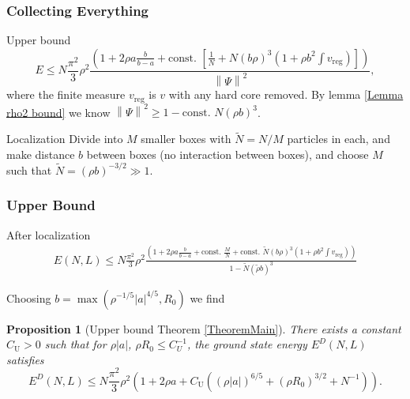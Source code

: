 \documentclass{beamer}[10]
\newcommand{\norm}[1]{\left\lVert #1 \right\rVert}
\newcommand{\abs}[1]{\left\lvert #1 \right\rvert}
\newtheorem{mproposition}{Proposition}
\begin{document}
\begin{frame}
	\frametitle{Collecting Everything}
	\begin{block}{Upper bound}
	\small\begin{equation}
	E\leq N\frac{\pi^2}{3}\rho^2\frac{\left(1+2\rho a\frac{b}{b-a} +\text{const. } \left[\frac{1}{N}+ N (b\rho)^3\left(1+\rho b^2\int v_{\text{reg}}\right)\right]\right)}{\norm{\Psi}^2},
	\end{equation}	
	where  the finite measure $ v_{\text{reg}} $ is $v$ with any hard core removed.
		By lemma \ref{Lemma rho2 bound} we know $ \norm{\Psi}^2\geq 1-\text{const. }N(\rho b)^3 $.
	\end{block}	
	\begin{block}{Localization}
		Divide into $ M $ smaller boxes with $ \tilde{N}=N/M $ particles in each, and make distance $ b $ between boxes (no interaction between boxes), and choose $ M $ such that $ \tilde{N}=(\rho b)^{-3/2}\gg 1 $.
	\end{block}

\end{frame}

\begin{frame}
	\frametitle{Upper Bound}
	\begin{block}{After localization}
\footnotesize\begin{equation}
\begin{aligned}
E(N,L)\leq N\frac{\pi^2}{3}\rho^2\frac{\left(1+2\rho a\frac{b}{b-a}+\text{const. }\frac{M}{N}+\text{const. }\tilde{N}(b\rho)^3\left(1+\rho b^2\int v_{\text{reg}}\right)\right)}{1-\tilde{N}(\tilde{\rho} b)^3}
\end{aligned}
\end{equation}

Choosing $ b=\max(\rho^{-1/5}\abs{a}^{4/5}, R_0) $ we find

\begin{mproposition}[Upper bound Theorem \ref{TheoremMain}]
	\label{PropositionUpperBound}
 There exists a constant $C_\text{U}>0$ such that for $\rho|a|$, $\rho R_0\leq C_U^{-1}$, the ground state energy $E^D(N,L)$ satisfies
	\small{\begin{equation}
	\label{equpper}
	E^D(N,L)\leq N\frac{\pi^2}{3}\rho^2\left(1+2\rho a + C_\text{U}\left((\rho\abs{a})^{6/5}+(\rho R_0)^{3/2}+N^{-1}\right)\right).
	\end{equation}}
\end{mproposition}

	\end{block}
	
\end{frame}
\end{document}
